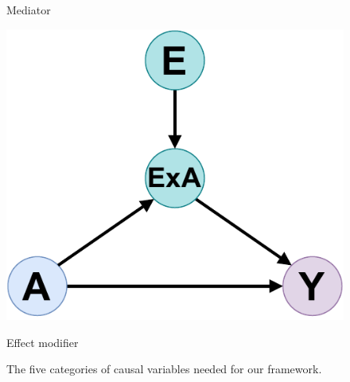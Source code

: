 \documentclass[french,12pt,twoside,a4paper]{book}
\begin{document}
\begin{figure}
\begin{minipage}[t]{0.18\linewidth}
    \small\sffamily Mediator
  \end{minipage}
  \hfill
  \begin{minipage}[t]{0.18\linewidth}
    \includegraphics[width=\linewidth]{img/chapter_4/effect_modifier.pdf}%

    \small\sffamily Effect modifier \scriptsize\\\citep[Represented
      following][]{attia2022proposal}
  \end{minipage}
  \caption{The five categories of causal variables needed for our
    framework.}\label{fig:causal_variables}
\end{figure}
\end{document}
